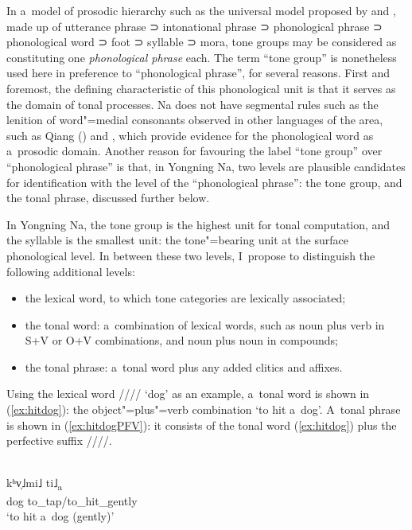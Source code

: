In a~model of prosodic hierarchy such as the universal model proposed by \citet{selkirk1986} and
\citet{nesporetal1986}, made up of utterance phrase ⊃
intonational phrase ⊃ phonological phrase ⊃ phonological word ⊃
      foot ⊃ syllable ⊃ mora, tone groups may be considered as
      constituting one \textit{phonological phrase} each. The term “tone group” is
      nonetheless used here in preference to “phonological phrase”, for several reasons. First and foremost, the defining characteristic of this phonological unit is that it serves as the domain of tonal processes. Na does not have segmental rules
      such as the lenition of word"=medial consonants observed in other languages of the area, such as Qiang
      (\citealt[31–32]{lapollaetal2003a}) and  \citep[12–13]{chirkova2009}, which provide evidence
      for the phonological word as a~prosodic domain. Another reason for favouring the label “tone group” over “phonological phrase” is that, in Yongning Na, two levels are plausible candidates for identification with the level of the “phonological phrase”: the tone group, and the tonal phrase, discussed further below.

 In Yongning Na, the tone group is the highest unit for tonal computation, and the syllable is the smallest unit: the tone"=bearing unit at the surface phonological level. In between these two levels, I~propose to distinguish the following additional levels:
 
 \begin{itemize}
 	\item{the lexical word, to which tone categories are lexically associated;}
 	\item{the tonal word: a~combination of lexical words, such as noun plus verb in S+V or O+V
 		combinations, and noun plus noun in compounds;}
 	\item{the tonal phrase: a~tonal word plus any added clitics and affixes.}
 \end{itemize}

Using the lexical word //// ‘dog' as an example, a~tonal word is shown in (\ref{ex:hitdog}): the object"=plus"=verb combination ‘to hit a~dog'. A~tonal phrase is shown in (\ref{ex:hitdogPFV}): it consists of the tonal word (\ref{ex:hitdog}) plus the {perfective} suffix ////.

\begin{exe}
	\ex
	\label{ex:hitdog}
	\\
	\gll kʰv̩˩mi˩				ti˩\textsubscript{a}\\
	dog		to\_tap/to\_hit\_gently\\
	\glt ‘to hit a~dog (gently)'
\end{exe}

